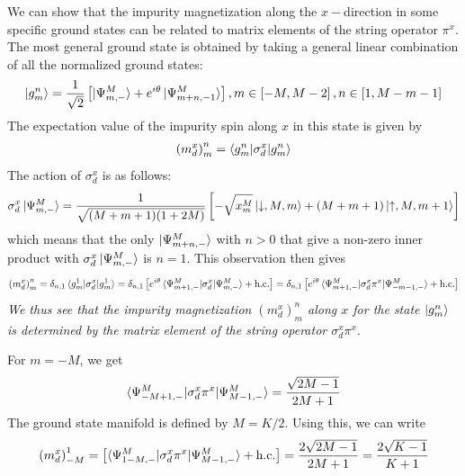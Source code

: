 \documentclass{revtex4-2}
\begin{document}
We can show that the impurity magnetization along the \(x-\)direction in some specific ground states can be related to matrix elements of the string operator \(\pi^x\). The most general ground state is obtained by taking a general linear combination of all the normalized ground states:
\begin{align}
	\ket{g^n_m} = \frac{1}{\sqrt 2}\left[\ket{\Psi^M_{m,-}} + e^{i\theta}\ket{\Psi^M_{m+n,-1}}\right], m \in \left[-M, M-2\right] , n \in \left[1, M - m - 1\right] 
\end{align}
The expectation value of the impurity spin along \(x\) in this state is given by
\begin{align}
	\left(m_d^x\right)_m^n = \braket{g^n_m | \sigma_d^x | g^n_m}
\end{align}
The action of \(\sigma_d^x\) is as follows:
\begin{align}
	\sigma_d^x \ket{\Psi^M_{m,-}} = \frac{1}{\sqrt{(M+m+1)(1+2M)}}\left[-\sqrt{x_m^M}\ket{\downarrow, M, m} + \left(M + m + 1\right)\ket{\uparrow,M,m+1}\right]
\end{align}
which means that the only \(\ket{\Psi^M_{m+n,-}}\) with \(n > 0\) that give a non-zero inner product with \(\sigma_d^x \ket{\Psi^M_{m,-}}\) is \(n=1\). This observation then gives
\begin{align}
	\left(m_d^x\right)_m^n = \delta_{n,1}\braket{g^1_m | \sigma_d^x | g^1_m} = \delta_{n,1}\left[e^{i\theta}\braket{\Psi^M_{m+1,-}|\sigma_d^x| \Psi^M_{m,-}} + \text{h.c.}\right] = \delta_{n,1}\left[e^{i\theta}\braket{\Psi^M_{m+1,-}|\sigma_d^x \pi^x | \Psi^M_{-m-1,-}} + \text{h.c.}\right]
\end{align}
\textit{We thus see that the impurity magnetization \(\left(m_d^x\right)_m^n\) along \(x\) for the state \(\ket{g^n_m}\) is determined by the matrix element of the string operator \(\sigma^x_d \pi^x\)}.

For \(m = -M\), we get
\begin{align}
	\braket{\Psi^M_{-M+1,-}|\sigma_d^x \pi^x | \Psi^M_{M - 1,-}} = \frac{\sqrt{2M-1}}{2M + 1}
\end{align}
The ground state manifold is defined by \(M = K/2\). Using this, we can write
\begin{align}
	\left(m_d^x\right)_{-M}^1 = \left[\braket{\Psi^M_{1-M,-}|\sigma_d^x \pi^x | \Psi^M_{M - 1,-}} + \text{h.c.}\right] = \frac{2\sqrt{2M-1}}{2M + 1} = \frac{2\sqrt{K-1}}{K+1}
\end{align}
\end{document}
